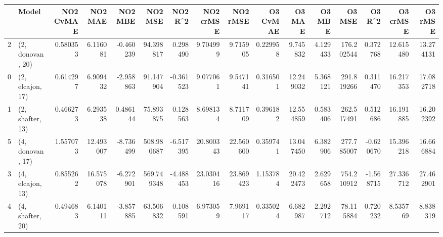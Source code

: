 \begin{tabular}{llrrrrrrrrrrrrrr}
\toprule
{} &             Model &  NO2 CvMAE &    NO2 MAE &   NO2 MBE &     NO2 MSE &   NO2 R\textasciicircum2 &  NO2 crMSE &   NO2 rMSE &  O3 CvMAE &     O3 MAE &    O3 MBE &      O3 MSE &    O3 R\textasciicircum2 &   O3 crMSE &    O3 rMSE \\
\midrule
2 &  (2, donovan, 20) &   0.580353 &   6.116081 & -0.460239 &   94.398817 &  0.298490 &   9.704999 &   9.715905 &  0.229958 &   9.745832 &  4.129433 &  176.202544 &  0.372768 &  12.615480 &  13.274131 \\
0 &  (2, elcajon, 17) &   0.614297 &   6.909432 & -2.958863 &   91.147904 & -0.361523 &   9.077061 &   9.547141 &  0.316501 &  12.249032 &  5.368121 &  291.819266 &  0.311470 &  16.217353 &  17.082718 \\
1 &  (2, shafter, 13) &   0.466273 &   6.293538 &  0.486144 &   75.893875 &  0.128563 &   8.698134 &   8.711709 &  0.396182 &  12.554859 &  0.583406 &  262.517491 &  0.512686 &  16.191885 &  16.202392 \\
5 &  (4, donovan, 17) &   1.557073 &  12.493007 & -8.736499 &  508.980687 & -6.517395 &  20.800343 &  22.560600 &  0.359741 &  13.047450 &  6.382906 &  277.785007 & -0.620670 &  15.396218 &  16.666884 \\
3 &  (4, elcajon, 13) &   0.855262 &  16.575078 & -6.272901 &  569.749348 & -4.488453 &  23.030416 &  23.869423 &  1.153784 &  20.422473 &  2.629658 &  754.210912 & -1.568715 &  27.336712 &  27.462901 \\
4 &  (4, shafter, 20) &   0.494683 &   6.140111 & -3.857885 &   63.506832 &  0.108591 &   6.973059 &   7.969117 &  0.335024 &   6.682987 &  2.292712 &   78.115884 &  0.720232 &   8.535769 &   8.838319 \\
\bottomrule
\end{tabular}
